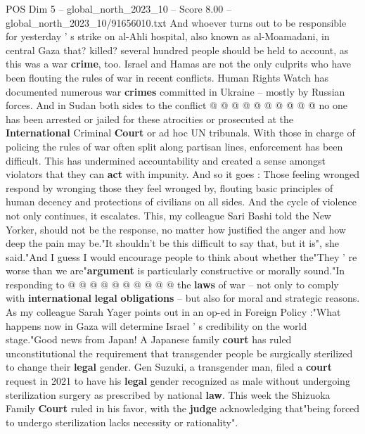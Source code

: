 \begin{textsample}{POS Dim 5 – global\_north\_2023\_10 – Score 8.00 – global\_north\_2023\_10/91656010.txt}
And whoever turns out to be responsible for yesterday ' s strike on al-Ahli hospital, also known as al-Moamadani, in central Gaza that? killed? several hundred people should be held to account, as this was a war \textbf{crime}, too.
Israel and Hamas are not the only culprits who have been flouting the rules of war in recent conflicts.
Human Rights Watch has documented numerous war \textbf{crimes} committed in Ukraine -- mostly by Russian forces.
And in Sudan both sides to the conflict @ @ @ @ @ @ @ @ @ @ no one has been arrested or jailed for these atrocities or prosecuted at the \textbf{International} Criminal \textbf{Court} or ad hoc UN tribunals.
With those in charge of policing the rules of war often split along partisan lines, enforcement has been difficult.
This has undermined accountability and created a sense amongst violators that they can \textbf{act} with impunity.
And so it goes : Those feeling wronged respond by wronging those they feel wronged by, flouting basic principles of human decency and protections of civilians on all sides.
And the cycle of violence not only continues, it escalates.
This, my colleague Sari Bashi told the New Yorker, should not be the response, no matter how justified the anger and how deep the pain may be."It shouldn't be this difficult to say that, but it is", she said."And I guess I would encourage people to think about whether the"They ' re worse than we are"\textbf{argument} is particularly constructive or morally sound."In responding to @ @ @ @ @ @ @ @ @ @ the \textbf{laws} of war -- not only to comply with \textbf{international} \textbf{legal} \textbf{obligations} -- but also for moral and strategic reasons.
As my colleague Sarah Yager points out in an op-ed in Foreign Policy :"What happens now in Gaza will determine Israel ' s credibility on the world stage."Good news from Japan!
A Japanese family \textbf{court} has ruled unconstitutional the requirement that transgender people be surgically sterilized to change their \textbf{legal} gender.
Gen Suzuki, a transgender man, filed a \textbf{court} request in 2021 to have his \textbf{legal} gender recognized as male without undergoing sterilization surgery as prescribed by national \textbf{law}.
This week the Shizuoka Family \textbf{Court} ruled in his favor, with the \textbf{judge} acknowledging that"being forced to undergo sterilization lacks necessity or rationality".

\end{textsample}
